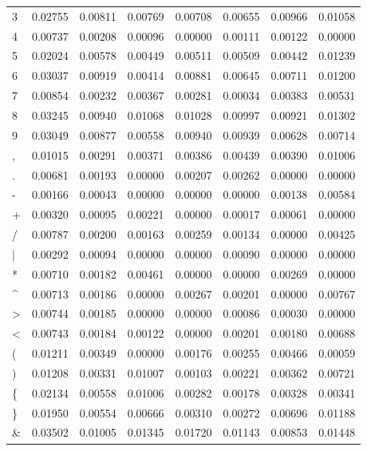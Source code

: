 \begin{tabularx}{\textwidth}{X|c|c|c|c|c|c|c}
3   & 0.02755 &  0.00811 &  0.00769 &  0.00708 &  0.00655 &  0.00966 &  0.01058 \\
4   & 0.00737 &  0.00208 &  0.00096 &  0.00000 &  0.00111 &  0.00122 &  0.00000 \\
5   & 0.02024 &  0.00578 &  0.00449 &  0.00511 &  0.00509 &  0.00442 &  0.01239 \\
6   & 0.03037 &  0.00919 &  0.00414 &  0.00881 &  0.00645 &  0.00711 &  0.01200 \\
7   & 0.00854 &  0.00232 &  0.00367 &  0.00281 &  0.00034 &  0.00383 &  0.00531 \\
8   & 0.03245 &  0.00940 &  0.01068 &  0.01028 &  0.00997 &  0.00921 &  0.01302 \\
9   & 0.03049 &  0.00877 &  0.00558 &  0.00940 &  0.00939 &  0.00628 &  0.00714 \\
,   & 0.01015 &  0.00291 &  0.00371 &  0.00386 &  0.00439 &  0.00390 &  0.01006 \\
.   & 0.00681 &  0.00193 &  0.00000 &  0.00207 &  0.00262 &  0.00000 &  0.00000 \\
-   & 0.00166 &  0.00043 &  0.00000 &  0.00000 &  0.00000 &  0.00138 &  0.00584 \\
+   & 0.00320 &  0.00095 &  0.00221 &  0.00000 &  0.00017 &  0.00061 &  0.00000 \\
/   & 0.00787 &  0.00200 &  0.00163 &  0.00259 &  0.00134 &  0.00000 &  0.00425 \\
|   & 0.00292 &  0.00094 &  0.00000 &  0.00000 &  0.00090 &  0.00000 &  0.00000 \\
*   & 0.00710 &  0.00182 &  0.00461 &  0.00000 &  0.00000 &  0.00269 &  0.00000 \\
\^{}& 0.00713 &  0.00186 &  0.00000 &  0.00267 &  0.00201 &  0.00000 &  0.00767 \\
>   & 0.00744 &  0.00185 &  0.00000 &  0.00000 &  0.00086 &  0.00030 &  0.00000 \\
<   & 0.00743 &  0.00184 &  0.00122 &  0.00000 &  0.00201 &  0.00180 &  0.00688 \\
(   & 0.01211 &  0.00349 &  0.00000 &  0.00176 &  0.00255 &  0.00466 &  0.00059 \\
)   & 0.01208 &  0.00331 &  0.01007 &  0.00103 &  0.00221 &  0.00362 &  0.00721 \\
\{  & 0.02134 &  0.00558 &  0.01006 &  0.00282 &  0.00178 &  0.00328 &  0.00341 \\
\}  & 0.01950 &  0.00554 &  0.00666 &  0.00310 &  0.00272 &  0.00696 &  0.01188 \\
\&  & 0.03502 &  0.01005 &  0.01345 &  0.01720 &  0.01143 &  0.00853 &  0.01448 \\

\end{tabularx}
